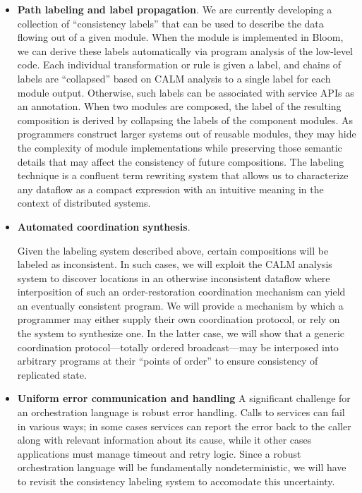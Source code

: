 \begin{itemize}
\item \textbf{Path labeling and label propagation}.
We are currently developing a collection of ``consistency labels'' that 
can be used to describe the data flowing out of a given module.  When the module
is implemented in Bloom, we can derive these labels automatically via program
analysis of the low-level code.  Each individual transformation or rule is 
given a label, and chains of labels are ``collapsed'' based on CALM analysis to 
a single label for each module output.  
Otherwise, such labels can be associated with service APIs as an annotation.  
When two modules are composed, the label of the resulting composition is derived
by collapsing the labels of the component modules.
As programmers construct larger systems out of reusable modules, they may 
hide the complexity of module implementations while preserving those semantic 
details that may affect the consistency of future compositions. The 
labeling technique is a confluent term rewriting system that allows us to 
characterize any dataflow as a compact expression with an intuitive 
meaning in the context of distributed systems.

\item \textbf{Automated coordination synthesis}.

Given the labeling system described above, certain compositions will be 
labeled as inconsistent.  In such cases, we will exploit the CALM
analysis system to discover locations in an otherwise 
inconsistent dataflow where interposition of such an order-restoration 
coordination mechanism can yield an eventually consistent program.
We will provide a mechanism by which a programmer may either supply 
their own coordination protocol, or rely on the system to synthesize one. 
In the latter case, we will show that a generic coordination 
protocol---totally ordered broadcast---may be interposed into arbitrary 
programs at their ``points of order''
to ensure consistency of replicated state.

\item \textbf{Uniform error communication and handling}
A significant challenge for an orchestration language is robust error handling.
Calls to services can fail in various ways; in some cases services can report the error
back to the caller along with relevant information about its cause, while it other cases
applications must manage timeout and retry logic.  Since a robust orchestration language will
be fundamentally nondeterministic, we will have to revisit the consistency labeling system to
accomodate this uncertainty.

\end{itemize}

